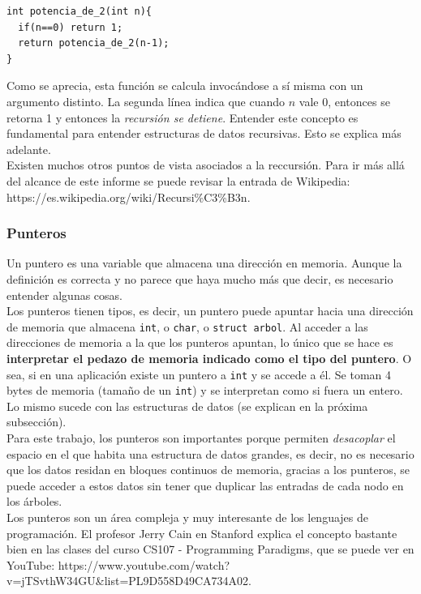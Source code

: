 \documentclass[12pt,letterpaper]{report}
\begin{document}
\begin{verbatim}
int potencia_de_2(int n){
  if(n==0) return 1;
  return potencia_de_2(n-1);
}
\end{verbatim}

Como se aprecia, esta función se calcula invocándose a sí misma con un argumento distinto. La segunda línea indica que cuando $n$ vale 0, entonces se retorna 1 y entonces la \emph{recursión se detiene}. Entender este concepto es fundamental para entender estructuras de datos recursivas. Esto se explica más adelante.\\

Existen muchos otros puntos de vista asociados a la reccursión. Para ir más allá del alcance de este informe se puede revisar la entrada de Wikipedia: https://es.wikipedia.org/wiki/Recursi\%C3\%B3n.

\subsubsection{Punteros}
Un puntero es una variable que almacena una dirección en memoria. Aunque la definición es correcta y no parece que haya mucho más que decir, es necesario entender algunas cosas.\\

Los punteros tienen tipos, es decir, un puntero puede apuntar hacia una dirección de memoria que almacena \texttt{int}, o \texttt{char}, o \texttt{struct arbol}. Al acceder a las direcciones de memoria a la que los punteros apuntan, lo único que se hace es \textbf{interpretar el pedazo de memoria indicado como el tipo del puntero}. O sea, si en una aplicación existe un puntero a \texttt{int} y se accede a él. Se toman 4 bytes de memoria (tamaño de un \texttt{int}) y se interpretan como si fuera un entero. Lo mismo sucede con las estructuras de datos (se explican en la próxima subsección).\\

Para este trabajo, los punteros son importantes porque permiten \emph{desacoplar} el espacio en el que habita una estructura de datos grandes, es decir, no es necesario que los datos residan en bloques continuos de memoria, gracias a los punteros, se puede acceder a estos datos sin tener que duplicar las entradas de cada nodo en los árboles.\\

Los punteros son un área compleja y muy interesante de los lenguajes de programación. El profesor Jerry Cain en Stanford explica el concepto bastante bien en las clases del curso CS107 - Programming Paradigms, que se puede ver en YouTube: https://www.youtube.com/watch?v=jTSvthW34GU&list=PL9D558D49CA734A02.
\end{document}
